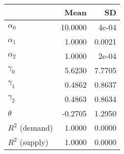 
\begin{tabular}[t]{lrr}
\toprule
  & Mean & SD\\
\midrule
$\alpha_{0}$ & 10.0000 & 4e-04\\
$\alpha_{1}$ & 1.0000 & 0.0021\\
$\alpha_{2}$ & 1.0000 & 2e-04\\
$\gamma_{0}$ & 5.6230 & 7.7705\\
$\gamma_{1}$ & 0.4862 & 0.8637\\
$\gamma_{2}$ & 0.4863 & 0.8634\\
$\theta$ & -0.2705 & 1.2950\\
$R^{2}$ (demand) & 1.0000 & 0.0000\\
$R^{2}$ (supply) & 1.0000 & 0.0000\\
\bottomrule
\end{tabular}
